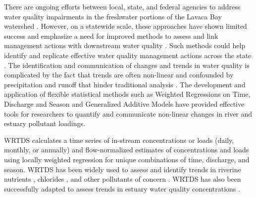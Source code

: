\documentclass[fleqn,10pt,lineno]{wlpeerj} %
\begin{document}
There are ongoing efforts between local, state, and federal agencies to
address water quality impairments in the freshwater portions of the
Lavaca Bay watershed
\autocite{jainTechnicalSupportDocument2021,schrammLavacaRiverWatershed2018,bertholdDirectMailingEducation2021}.
However, on a statewide scale, these approaches have shown limited
success and emphasize a need for improved methods to assess and link
management actions with downstream water quality
\autocite{schrammTotalMaximumDaily2022}. Such methods could help
identify and replicate effective water quality management actions across
the state . The identification and communication of changes and trends
in water quality is complicated by the fact that trends are often
non-linear and confounded by precipitation and runoff that hinder
traditional analysis
\autocite{wazniakLinkingWaterQuality2007,lloydMethodsDetectingChange2014}.
The development and application of flexible statistical methods such as
Weighted Regressions on Time, Discharge and Season
\autocite[WRTDS,][]{hirschWeightedRegressionsTime2010} and Generalized
Additive Models \autocite[GAMs,][]{woodFastStableRestricted2011} have
provided effective tools for researchers to quantify and communicate
non-linear changes in river and estuary pollutant loadings.

WRTDS calculates a time series of in-stream concentrations or loads
(daily, monthly, or annually) and flow-normalized estimates of
concentrations and loads using locally weighted regression for unique
combinations of time, discharge, and season. WRTDS has been widely used
to assess and identify trends in riverine nutrients
\autocite{oelsner_recent_2019,stackpooleLongTermMississippi2021},
chlorides \autocite{stetsIncreasingChlorideRivers2018}, and other
pollutants of concern \autocite{shodaWaterqualityTrendsRivers2019}.
WRTDS has also been successfully adapted to assess trends in estuary
water quality concentrations \autocite{beckFourDecadesWater2018}.
\end{document}
